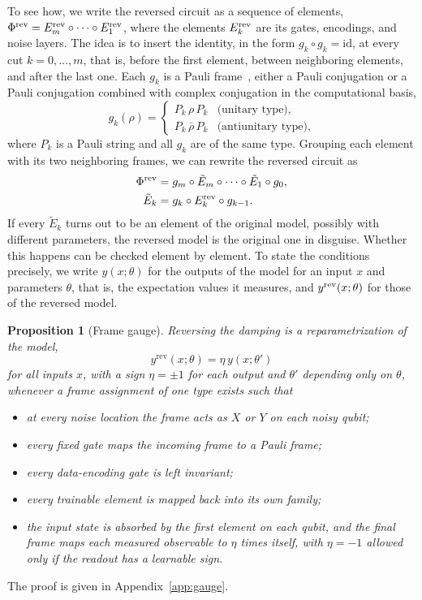 \documentclass[
 aps,pra,
 twocolumn,
 superscriptaddress,
 longbibliography,
 nofootinbib
]{revtex4-2}
\newtheorem{proposition}{Proposition}
\begin{document}
To see how, we write the reversed circuit as a sequence of elements,
$\Phi^{\rm rev}=E^{\rm rev}_m\circ\dots\circ E^{\rm rev}_1$, where the
elements $E^{\rm rev}_k$ are its gates, encodings, and noise layers. The idea
is to insert the identity, in the form $g_k\circ g_k=\mathrm{id}$, at every cut
$k=0,\dots,m$, that is, before the first element, between neighboring
elements, and after the last one. Each $g_k$ is a Pauli
frame~\cite{knill2005quantum}, either a Pauli conjugation or a Pauli
conjugation combined with complex conjugation in the computational basis,
\begin{equation}
g_k(\rho)=
\begin{cases}
P_k\,\rho\,P_k & \text{(unitary type)},\\
P_k\,\bar\rho\,P_k & \text{(antiunitary type)},
\end{cases}
\label{eq:frame}
\end{equation}
where $P_k$ is a Pauli string and all $g_k$ are of the same type. Grouping
each element with its two neighboring frames, we can rewrite the reversed
circuit as
\begin{align}
\Phi^{\rm rev}&=g_m\circ\tilde E_m\circ\dots\circ\tilde E_1\circ g_0,
\label{eq:framed}\\
\tilde E_k&=g_k\circ E^{\rm rev}_k\circ g_{k-1} .
\label{eq:framed_k}
\end{align}
If every $\tilde E_k$ turns out to be an element of the original model,
possibly with different parameters, the reversed model is the original one in
disguise. Whether this happens can be checked element by element. To state the
conditions precisely, we write $y(x;\theta)$ for the outputs of
the model for an input $x$ and parameters $\theta$, that is, the expectation
values it measures, and $y^{\rm rev}(x;\theta)$ for those of the reversed
model.

\begin{proposition}[Frame gauge]\label{prop:gauge}
Reversing the damping is a reparametrization of the model,
\begin{equation}
y^{\mathrm{rev}}(x;\theta)=\eta\,y(x;\theta')
\label{eq:reparam}
\end{equation}
for all inputs $x$, with a sign $\eta=\pm1$ for each output and $\theta'$ depending only on $\theta$, whenever a frame assignment of one type exists such that
\begin{itemize}
\item[(i)] at every noise location the frame acts as $X$ or $Y$ on each noisy qubit;
\item[(ii)] every fixed gate maps the incoming frame to a Pauli frame;
\item[(iii)] every data-encoding gate is left invariant;
\item[(iv)] every trainable element is mapped back into its own family;
\item[(v)] the input state is absorbed by the first element on each qubit, and the final frame
maps each measured observable to $\eta$ times itself, with $\eta=-1$ allowed only if the readout
has a learnable sign.
\end{itemize}
\end{proposition}
\noindent The proof is given in Appendix~\ref{app:gauge}.
\end{document}
